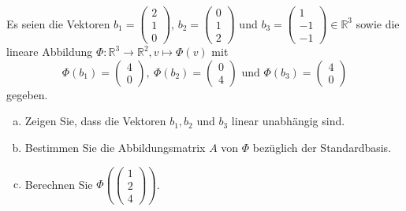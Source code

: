 \documentclass[a4paper,11pt]{scrartcl}
\newcommand{\RR}{\mathbb{R}}
\begin{document}
Es seien die Vektoren $b_1=\begin{pmatrix} 2\\1\\0\end{pmatrix}$, $b_2=\begin{pmatrix} 0\\1\\2\end{pmatrix}$ und $b_3=\begin{pmatrix} 1\\-1\\-1\end{pmatrix} \in \RR^3$ sowie die lineare Abbildung 
$
\Phi: \RR^3 \to \RR^2, v \mapsto \Phi(v)
$
mit 
$$
\Phi(b_1)=\begin{pmatrix} 4\\0\end{pmatrix}, \ \Phi(b_2)=\begin{pmatrix} 0\\4\end{pmatrix} \text{ und } \Phi(b_3)=\begin{pmatrix} 4\\0\end{pmatrix}
$$
gegeben.

\begin{enumerate}[a)]

\item Zeigen Sie, dass die Vektoren $b_1,b_2$ und $b_3$ linear unabhängig sind.
\item Bestimmen Sie die Abbildungsmatrix $A$ von $\Phi$ bezüglich der Standardbasis.
\item Berechnen Sie $\Phi(\begin{pmatrix} 1\\2\\4 \end{pmatrix})$.

\end{enumerate}
%
%
\end{document}
